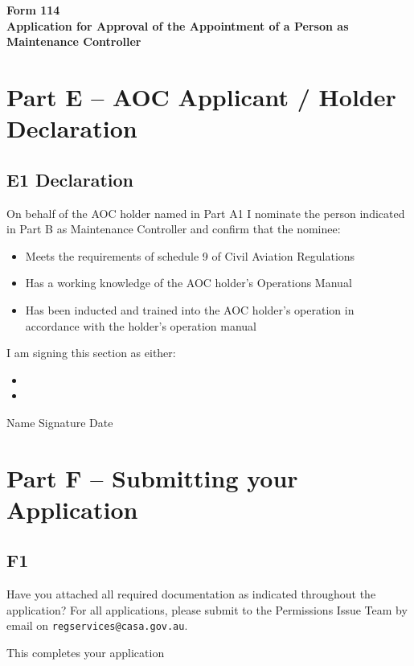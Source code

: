 \documentclass[11pt]{article}
\begin{document}
\noindent
\textbf{Form 114} \\
\textbf{Application for Approval of the Appointment of a Person as Maintenance Controller}

\section*{Part E -- AOC Applicant / Holder Declaration}

\subsection*{E1 Declaration}
On behalf of the AOC holder named in Part A1 I nominate the person indicated in Part B as Maintenance Controller and confirm that the nominee:

\begin{itemize}[leftmargin=*]
    \item Meets the requirements of schedule 9 of Civil Aviation Regulations \hfill {} 
    \item Has a working knowledge of the AOC holder’s Operations Manual \hfill {} 
    \item Has been inducted and trained into the AOC holder’s operation in accordance with the holder’s operation manual \hfill {} 
\end{itemize}

I am signing this section as either:
\begin{itemize}[leftmargin=*]
    \item {} 
    \item {}
\end{itemize}

\noindent Name \underline{\hspace{2.5in}} Signature \underline{\hspace{2.5in}} Date \underline{\hspace{1.5in}}

\section*{Part F -- Submitting your Application}

\subsection*{F1}
Have you attached all required documentation as indicated throughout the application? For all applications, please submit to the Permissions Issue Team by email on \texttt{regservices@casa.gov.au}.

\vspace{10pt}
\noindent This completes your application
\end{document}
